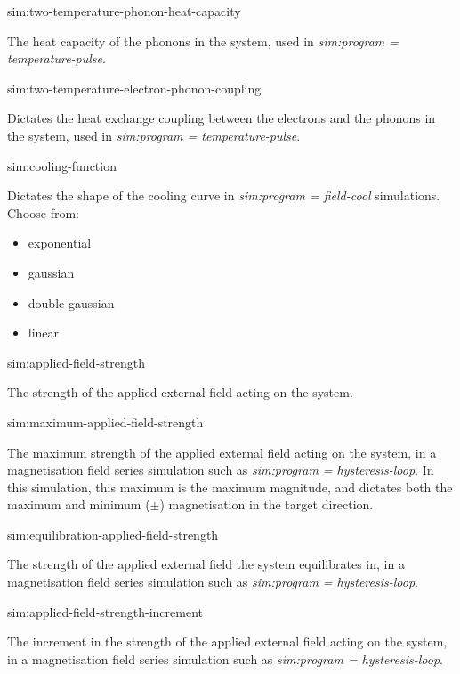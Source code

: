 {\zicf sim:two-temperature-phonon-heat-capacity} The heat capacity of the phonons in the system, used in \textit{sim:program = temperature-pulse}.

{\zicf sim:two-temperature-electron-phonon-coupling}
Dictates the heat exchange coupling between the electrons and the phonons in the system, used in \newline\textit{sim:program = temperature-pulse}.

{\zicf sim:cooling-function} Dictates the shape of the cooling curve in \textit{sim:program = field-cool} simulations. Choose from:

\begin{itemize}
    \item[] exponential
    \item[] gaussian
    \item[] double-gaussian
    \item[] linear
\end{itemize}

{\zicf sim:applied-field-strength} The strength of the applied external field acting on the system.

{\zicf  sim:maximum-applied-field-strength}
The maximum strength of the applied external field acting on the system, in a magnetisation field series simulation such as \textit{sim:program = hysteresis-loop}. In this simulation, this maximum is the maximum magnitude, and dictates both the maximum and minimum ($\pm$) magnetisation in the target direction.

{\zicf sim:equilibration-applied-field-strength}
   The strength of the applied external field the system equilibrates in, in a magnetisation field series simulation such as \textit{sim:program = hysteresis-loop}.

{\zicf sim:applied-field-strength-increment}
   The increment in the strength of the applied external field acting on the system, in a magnetisation field series simulation such as \textit{sim:program = hysteresis-loop}.


